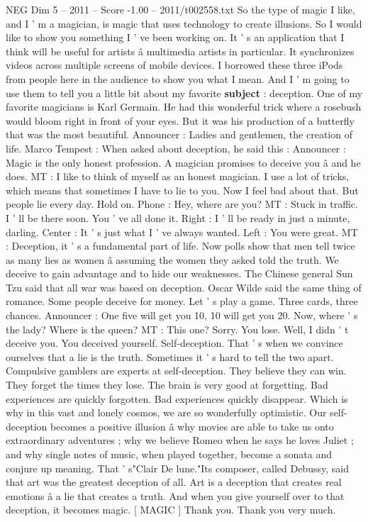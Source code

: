\begin{textsample}{NEG Dim 5 – 2011 – Score -1.00 – 2011/t002558.txt}  \label{ex:f5_neg_051}
So the type of magic I like, and I ' m a magician, is magic that uses technology to create illusions.
So I would like to show you something I ' ve been working on.
It ' s an application that I think will be useful for artists â multimedia artists in particular.
It synchronizes videos across multiple screens of mobile devices.
I borrowed these three iPods from people here in the audience to show you what I mean.
And I ' m going to use them to tell you a little bit about my favorite \textbf{subject} : deception.
One of my favorite magicians is Karl Germain.
He had this wonderful trick where a rosebush would bloom right in front of your eyes.
But it was his production of a butterfly that was the most beautiful.
Announcer : Ladies and gentlemen, the creation of life.
Marco Tempest : When asked about deception, he said this : Announcer : Magic is the only honest profession.
A magician promises to deceive you â and he does.
MT : I like to think of myself as an honest magician.
I use a lot of tricks, which means that sometimes I have to lie to you.
Now I feel bad about that.
But people lie every day.
Hold on.
Phone : Hey, where are you?
MT : Stuck in traffic.
I ' ll be there soon.
You ' ve all done it.
Right : I ' ll be ready in just a minute, darling.
Center : It ' s just what I ' ve always wanted.
Left : You were great.
MT : Deception, it ' s a fundamental part of life.
Now polls show that men tell twice as many lies as women â assuming the women they asked told the truth.
We deceive to gain advantage and to hide our weaknesses.
The Chinese general Sun Tzu said that all war was based on deception.
Oscar Wilde said the same thing of romance.
Some people deceive for money.
Let ' s play a game.
Three cards, three chances.
Announcer : One five will get you 10, 10 will get you 20.
Now, where ' s the lady?
Where is the queen?
MT : This one?
Sorry.
You lose.
Well, I didn ' t deceive you.
You deceived yourself.
Self-deception.
That ' s when we convince ourselves that a lie is the truth.
Sometimes it ' s hard to tell the two apart.
Compulsive gamblers are experts at self-deception.
They believe they can win.
They forget the times they lose.
The brain is very good at forgetting.
Bad experiences are quickly forgotten.
Bad experiences quickly disappear.
Which is why in this vast and lonely cosmos, we are so wonderfully optimistic.
Our self-deception becomes a positive illusion â why movies are able to take us onto extraordinary adventures ; why we believe Romeo when he says he loves Juliet ; and why single notes of music, when played together, become a sonata and conjure up meaning.
That ' s"Clair De lune."Its composer, called Debussy, said that art was the greatest deception of all.
Art is a deception that creates real emotions â a lie that creates a truth.
And when you give yourself over to that deception, it becomes magic. [ MAGIC ] Thank you.
Thank you very much.

\end{textsample}
